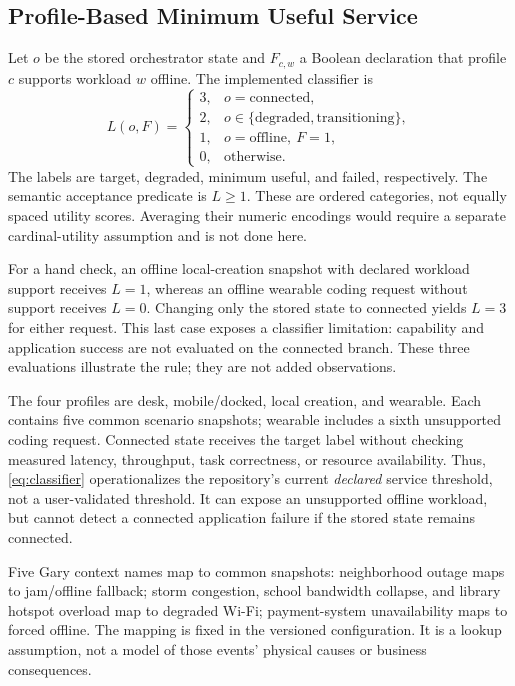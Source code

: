 \subsection{Profile-Based Minimum Useful Service}
Let $o$ be the stored orchestrator state and $F_{c,w}$ a Boolean declaration that profile $c$ supports workload $w$ offline. The implemented classifier is
\begin{equation}
L(o,F)=\begin{cases}
3,&o=\mathrm{connected},\\
2,&o\in\{\mathrm{degraded},\mathrm{transitioning}\},\\
1,&o=\mathrm{offline},\ F=1,\\
0,&\text{otherwise}.
\end{cases}\label{eq:classifier}
\end{equation}
The labels are target, degraded, minimum useful, and failed, respectively. The semantic acceptance predicate is $L\geq1$. These are ordered categories, not equally spaced utility scores. Averaging their numeric encodings would require a separate cardinal-utility assumption and is not done here.

For a hand check, an offline local-creation snapshot with declared workload support receives $L=1$, whereas an offline wearable coding request without support receives $L=0$. Changing only the stored state to connected yields $L=3$ for either request. This last case exposes a classifier limitation: capability and application success are not evaluated on the connected branch. These three evaluations illustrate the rule; they are not added observations.

The four profiles are desk, mobile/docked, local creation, and wearable. Each contains five common scenario snapshots; wearable includes a sixth unsupported coding request. Connected state receives the target label without checking measured latency, throughput, task correctness, or resource availability. Thus, \eqref{eq:classifier} operationalizes the repository's current \emph{declared} service threshold, not a user-validated threshold. It can expose an unsupported offline workload, but cannot detect a connected application failure if the stored state remains connected.

Five Gary context names map to common snapshots: neighborhood outage maps to jam/offline fallback; storm congestion, school bandwidth collapse, and library hotspot overload map to degraded Wi-Fi; payment-system unavailability maps to forced offline. The mapping is fixed in the versioned configuration. It is a lookup assumption, not a model of those events' physical causes or business consequences.

